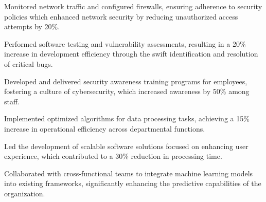 \documentclass[10pt, A4]{classic}
\begin{document}
    \begin{highlights}
            \item {Monitored network traffic and configured firewalls, ensuring adherence to security policies which enhanced network security by reducing unauthorized access attempts by 20\%.}
            \item {Performed software testing and vulnerability assessments, resulting in a 20\% increase in development efficiency through the swift identification and resolution of critical bugs.}
            \item {Developed and delivered security awareness training programs for employees, fostering a culture of cybersecurity, which increased awareness by 50\% among staff.}
        \end{highlights}
        
    \begin{highlights}
            \item {Implemented optimized algorithms for data processing tasks, achieving a 15\% increase in operational efficiency across departmental functions.}
            \item {Led the development of scalable software solutions focused on enhancing user experience, which contributed to a 30\% reduction in processing time.}
            \item {Collaborated with cross{-}functional teams to integrate machine learning models into existing frameworks, significantly enhancing the predictive capabilities of the organization.}
        \end{highlights}

        
        
        
        
    
\end{document}
